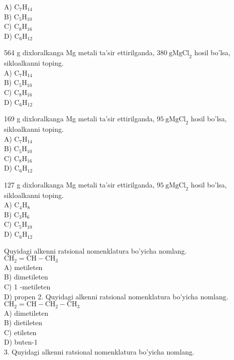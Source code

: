 A) $\mathrm{C}_{7} \mathrm{H}_{14}$\\
B) $\mathrm{C}_{5} \mathrm{H}_{10}$\\
C) $\mathrm{C}_{8} \mathrm{H}_{16}$\\
D) $\mathrm{C}_{6} \mathrm{H}_{12}$
  \item 564 g dixloralkanga Mg metali ta'sir ettirilganda, $380 \mathrm{~g} \mathrm{MgCl}_{2}$ hosil bo'lsa, sikloalkanni toping.\\
A) $\mathrm{C}_{7} \mathrm{H}_{14}$\\
B) $\mathrm{C}_{5} \mathrm{H}_{10}$\\
C) $\mathrm{C}_{8} \mathrm{H}_{16}$\\
D) $\mathrm{C}_{6} \mathrm{H}_{12}$
  \item 169 g dixloralkanga Mg metali ta'sir ettirilganda, $95 \mathrm{~g} \mathrm{MgCl}_{2}$ hosil bo'lsa, sikloalkanni toping.\\
A) $\mathrm{C}_{7} \mathrm{H}_{14}$\\
B) $\mathrm{C}_{5} \mathrm{H}_{10}$\\
C) $\mathrm{C}_{8} \mathrm{H}_{16}$\\
D) $\mathrm{C}_{6} \mathrm{H}_{12}$
  \item 127 g dixloralkanga Mg metali ta'sir ettirilganda, $95 \mathrm{~g} \mathrm{MgCl}_{2}$ hosil bo'lsa, sikloalkanni toping.\\
A) $\mathrm{C}_{4} \mathrm{H}_{8}$\\
B) $\mathrm{C}_{3} \mathrm{H}_{6}$\\
C) $\mathrm{C}_{5} \mathrm{H}_{10}$\\
D) $\mathrm{C}_{6} \mathrm{H}_{12}$
  \item Quyidagi alkenni ratsional nomenklatura bo'yicha nomlang.\\
$\mathrm{CH}_{2}=\mathrm{CH}-\mathrm{CH}_{3}$\\
A) metileten\\
B) dimetileten\\
C) 1 -metileten\\
D) propen
2. Quyidagi alkenni ratsional nomenklatura bo'yicha nomlang.\\
$\mathrm{CH}_{2}=\mathrm{CH}-\mathrm{CH}_{2}-\mathrm{CH}_{3}$\\
A) dimetileten\\
B) dietileten\\
C) etileten\\
D) buten-1\\
3. Quyidagi alkenni ratsional nomenklatura bo'yicha nomlang.\\

